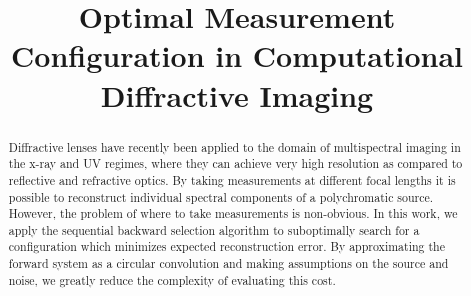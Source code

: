 \documentclass{article}
\title{Optimal Measurement Configuration in Computational \\ Diffractive Imaging}
\begin{document}
\maketitle

\begin{abstract}

Diffractive lenses have recently been applied to the domain of multispectral
imaging in the x-ray and UV regimes, where they can achieve very high resolution
as compared to reflective and refractive optics. By taking measurements at
different focal lengths it is possible to reconstruct individual spectral
components of a polychromatic source. However, the problem of where to take
measurements is non-obvious. In this work, we apply the sequential backward selection
algorithm to suboptimally search for a configuration which minimizes expected
reconstruction error. By approximating the forward system as a circular
convolution and making assumptions on the source and noise, we greatly reduce the complexity of evaluating this cost.

\end{abstract}
\end{document}

